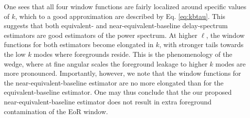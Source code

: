 \documentclass[twocolumn,apj,numberedappendix]{emulateapj}
\renewcommand\[{\begin{equation}}
\renewcommand\]{\end{equation}}
\begin{document}
One sees that all four window functions are fairly localized around specific values of $k$, which to a good approximation are described by Eq. \eqref{eq:kbtau}. This suggests that both equivalent- and near-equivalent-baseline delay-spectrum estimators are good estimators of the power spectrum. At higher $\ell$, the window functions for both estimators become elongated in $k$, with stronger tails towards the low $k$ modes where foregrounds reside. This is the phenomenology of the wedge, where at fine angular scales the foreground leakage to higher $k$ modes are more pronounced. Importantly, however, we note that the window functions for the near-equivalent-baseline estimator are no more elongated than for the equivalent-baseline estimator. One may thus conclude that the our proposed near-equivalent-baseline estimator does not result in extra foreground contamination of the EoR window.

\end{document}
